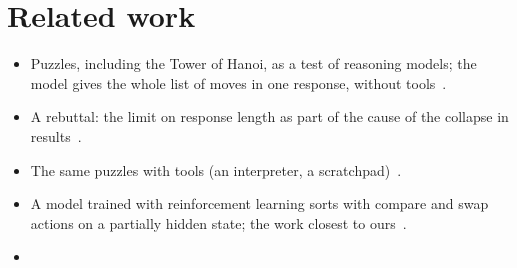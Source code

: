 \section{Related work}
\label{sec:related-work}


\begin{itemize}
  \item Puzzles, including the Tower of Hanoi, as a test of reasoning models; the model gives the whole list of moves
    in one response, without tools~\cite{shojaee2025illusion}.
  \item A rebuttal: the limit on response length as part of the cause of the collapse in
    results~\cite{lawsen2025comment}.
  \item The same puzzles with tools (an interpreter, a scratchpad)~\cite{song2025thinking}.
  \item A model trained with reinforcement learning sorts with compare and swap actions on a partially hidden state;
    the work closest to ours~\cite{yue2025earl}.
  \item {}
\end{itemize}
